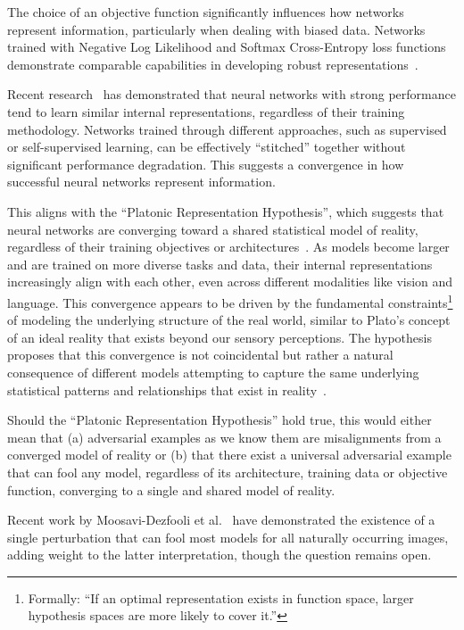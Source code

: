 \documentclass[a4paper, oneside]{discothesis}
\begin{document}
The choice of an objective function significantly influences how networks represent information, particularly when dealing with biased data. Networks trained with Negative Log Likelihood and Softmax Cross-Entropy loss functions demonstrate comparable capabilities in developing robust representations~\cite{bangaru2022interpreting}.

Recent research~\cite{bansal2021revisiting} has demonstrated that neural networks with strong performance tend to learn similar internal representations, regardless of their training methodology. Networks trained through different approaches, such as supervised or self-supervised learning, can be effectively ``stitched'' together without significant performance degradation. This suggests a convergence in how successful neural networks represent information.

This aligns with the ``Platonic Representation Hypothesis'', which suggests that neural networks are converging toward a shared statistical model of reality, regardless of their training objectives or architectures~\cite{huh2024platonic}. As models become larger and are trained on more diverse tasks and data, their internal representations increasingly align with each other, even across different modalities like vision and language. This convergence appears to be driven by the fundamental constraints\footnote{Formally: ``If an optimal representation exists in function space, larger hypothesis spaces are more likely to cover it.''} of modeling the underlying structure of the real world, similar to Plato's concept of an ideal reality that exists beyond our sensory perceptions. The hypothesis proposes that this convergence is not coincidental but rather a natural consequence of different models attempting to capture the same underlying statistical patterns and relationships that exist in reality~\cite{huh2024platonic}. 

Should the ``Platonic Representation Hypothesis'' hold true, this would either mean that (a) adversarial examples as we know them are misalignments from a converged model of reality or (b) that there exist a universal adversarial example that can fool any model, regardless of its architecture, training data or objective function, converging to a single and shared model of reality.

Recent work by Moosavi-Dezfooli et al.\ \cite{moosavi2017universal} have demonstrated the existence of a single perturbation that can fool most models for all naturally occurring images, adding weight to the latter interpretation, though the question remains open.
\end{document}
